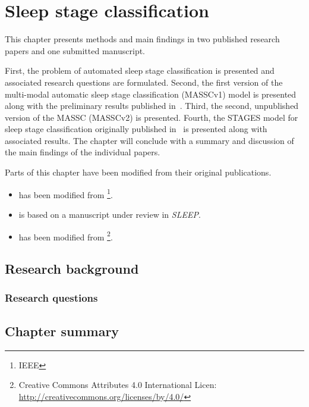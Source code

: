 \chapter{Sleep stage classification}\label{chap:sleep-stage-classification}

This chapter presents methods and main findings in two published research papers and one submitted manuscript.

First, the problem of automated sleep stage classification is presented and associated research questions are formulated. Second, the first version of the multi-modal automatic sleep stage classification (MASSCv1) model is presented along with the preliminary results published in~\cite{Olesen2018c}. Third, the second, unpublished version of the MASSC (MASSCv2) is presented. Fourth, the STAGES model for sleep stage classification originally published in~\cite{Stephansen2018} is presented along with associated results. The chapter will conclude with a summary and discussion of the main findings of the individual papers.

Parts of this chapter have been modified from their original publications. 
\begin{itemize}
    \item {} has been modified from \newline {}\footnote{ IEEE}.
    \item {} is based on a manuscript under review in \textit{SLEEP}.
    \item {} has been modified from \newline {}\footnote{Creative Commons Attributes 4.0 International Licen: \url{http://creativecommons.org/licenses/by/4.0/}}.
\end{itemize} 

\section{Research background}
\subsection{Research questions}





\section{Chapter summary}